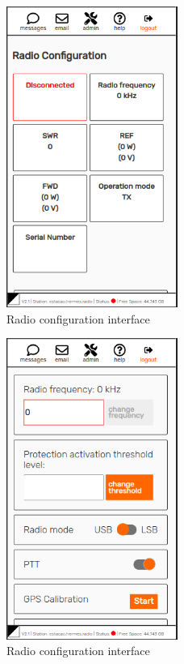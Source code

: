 \documentclass[11pt,a4paper]{article}
\begin{document}
\begin{figure}[H]
    \centering
    \includegraphics[width=0.5\textwidth]{screenshots/frontend/en/radioconfig.png}
    \caption{Radio configuration interface}
	\vspace{-10pt}
    \label{fig:radioconf}
\end{figure}    

\begin{figure}[H]
    \centering
    \includegraphics[width=0.5\textwidth]{screenshots/frontend/en/radioconfig2.png}
    \caption{Radio configuration interface}
	\vspace{-10pt}
    \label{fig:radioconf2}
\end{figure}
\end{document}
